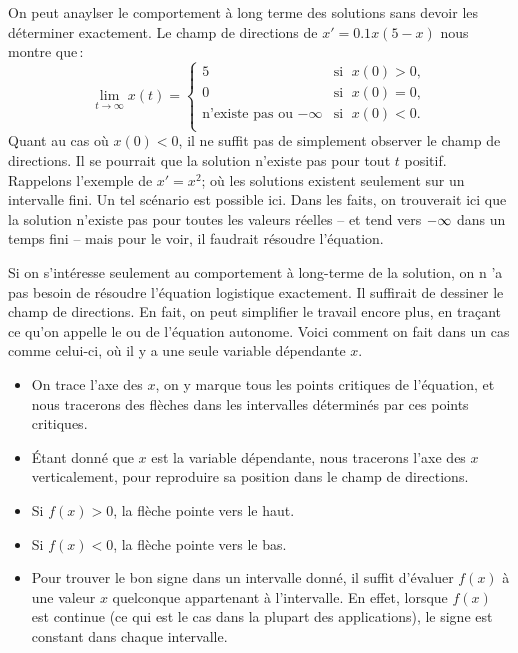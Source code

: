 On peut anaylser le comportement à long terme des solutions sans devoir les déterminer exactement.  Le champ de directions de $x' = 0.1 x(5-x)$ nous montre que\,: 
%
\begin{equation*}
\lim_{t\to \infty} x(t) = 
\begin{cases}
5 & \text{si } \; x(0) > 0 , \\
0 & \text{si } \; x(0) = 0 , \\
\text{n'existe pas ou } {-\infty} & \text{si } \; x(0) < 0 . \\
\end{cases}
\end{equation*}
Quant au cas où $x(0) < 0$, il ne suffit pas de simplement observer le champ de directions.  Il se pourrait que la solution n'existe pas pour tout $t$ positif.
Rappelons l'exemple de $x' = x^2$; où les solutions existent seulement sur un intervalle fini.  Un tel scénario est possible ici.  Dans les faits, on trouverait ici que la solution n'existe pas pour toutes les valeurs réelles -- et tend vers $-\infty$ dans un temps fini --  mais pour le voir, il faudrait résoudre l'équation.

Si on s'intéresse seulement au comportement à long-terme de la solution, on n 'a pas besoin de résoudre l'équation logistique exactement.  Il suffirait de dessiner le champ de directions.  En fait, on peut simplifier le travail encore plus, en traçant ce qu'on appelle le \emph{} ou
\emph{} de l'équation autonome.  Voici comment on fait dans un cas comme celui-ci, où il y a une seule variable dépendante $x$.  
\begin{itemize}
\item On trace l'axe des $x$, on y marque tous les points critiques de l'équation, et nous tracerons des flèches dans les intervalles déterminés par ces points critiques.  
\item Étant donné que $x$ est la variable dépendante, nous tracerons l'axe des $x$ verticalement, pour reproduire sa position dans le champ de directions. 
\item Si $f(x) > 0$, la flèche pointe vers le haut.  
\item Si $f(x) < 0$, la flèche pointe vers le bas.  
\item Pour trouver le bon signe dans un intervalle donné, il suffit d'évaluer $f(x)$ à une valeur $x$ quelconque appartenant à l'intervalle. En effet, lorsque $f(x)$ est continue (ce qui est le cas dans la plupart des applications), le signe est constant dans chaque intervalle. 
\end{itemize}

